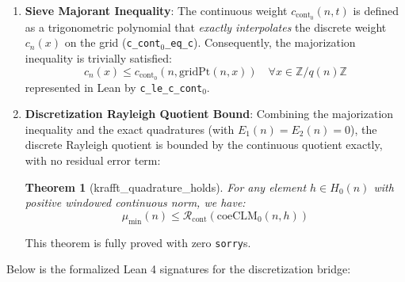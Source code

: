 \documentclass[10pt,twoside]{article}
\newtheorem{theorem}{Theorem}[section]
\begin{document}
\begin{enumerate}
    \item \textbf{Sieve Majorant Inequality}: The continuous weight $c_{\text{cont}_0}(n, t)$ is defined as a trigonometric polynomial that \emph{exactly interpolates} the discrete weight $c_n(x)$ on the grid (\texttt{c\_cont$_0$\_eq\_c}). Consequently, the majorization inequality is trivially satisfied:
    \begin{equation}
    c_n(x) \le c_{\text{cont}_0}(n, \text{gridPt}(n, x)) \quad \forall x \in \mathbb{Z}/q(n)\mathbb{Z}
    \end{equation}
    represented in Lean by \texttt{c\_le\_c\_cont$_0$}.
    
    \item \textbf{Discretization Rayleigh Quotient Bound}: Combining the majorization inequality and the exact quadratures (with $E_1(n) = E_2(n) = 0$), the discrete Rayleigh quotient is bounded by the continuous quotient exactly, with no residual error term:
    \begin{theorem}[krafft\_quadrature\_holds]
    For any element $h \in H_0(n)$ with positive windowed continuous norm, we have:
    \begin{equation}
    \mu_{\min}(n) \le \mathcal{R}_{\text{cont}}(\text{coeCLM}_0(n, h))
    \end{equation}
    \end{theorem}
    This theorem is fully proved with zero \texttt{sorry}s.
\end{enumerate}

Below is the formalized Lean 4 signatures for the discretization bridge:
\end{document}
